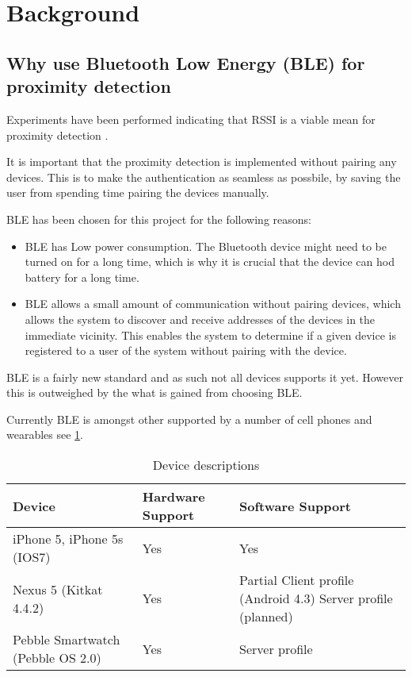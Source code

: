 \section{Background}

\subsection{Why use Bluetooth Low Energy (BLE) for proximity detection}

Experiments have been performed indicating that RSSI is a viable mean for proximity detection \cite{ref:Takashi}. 

It is important that the proximity detection is implemented without pairing any devices. This is to make the authentication as seamless as possbile, by saving the user from spending time pairing the devices manually.

BLE has been chosen for this project for the following reasons:
\begin{itemize}
	\item BLE has Low power consumption. The Bluetooth device might need to be turned on for a long time, which is why it is crucial that the device can hod battery for a long time.
	\item BLE allows a small amount of communication without pairing devices, which allows the system to discover and receive addresses of the devices in the immediate vicinity. This enables the system to determine if a given device is registered to a user of the system without pairing with the device.
\end{itemize}

BLE is a fairly new standard and as such not all devices supports it yet. However this is outweighed by the what is gained from choosing BLE. 

Currently BLE is amongst other supported by a number of cell phones and wearables see \cref{table:devices}.

\begin{table}[!t]
\caption{Device descriptions}
\label{table:devices}
\centering
\begin{tabular}{|p{2.3cm}|p{1.3cm}|p{3.8cm}|}
\hline
\textbf{Device} & \textbf{Hardware Support} & \textbf{Software Support}\\
\hline
iPhone 5, iPhone 5s (IOS7) & Yes & Yes\\
\hline
Nexus 5 \newline (Kitkat 4.4.2) & Yes & Partial \newline
Client profile (Android 4.3)
Server profile (planned)\\
\hline
Pebble Smartwatch (Pebble OS 2.0) & Yes & Server profile\\
\hline
\end{tabular}
\end{table}


